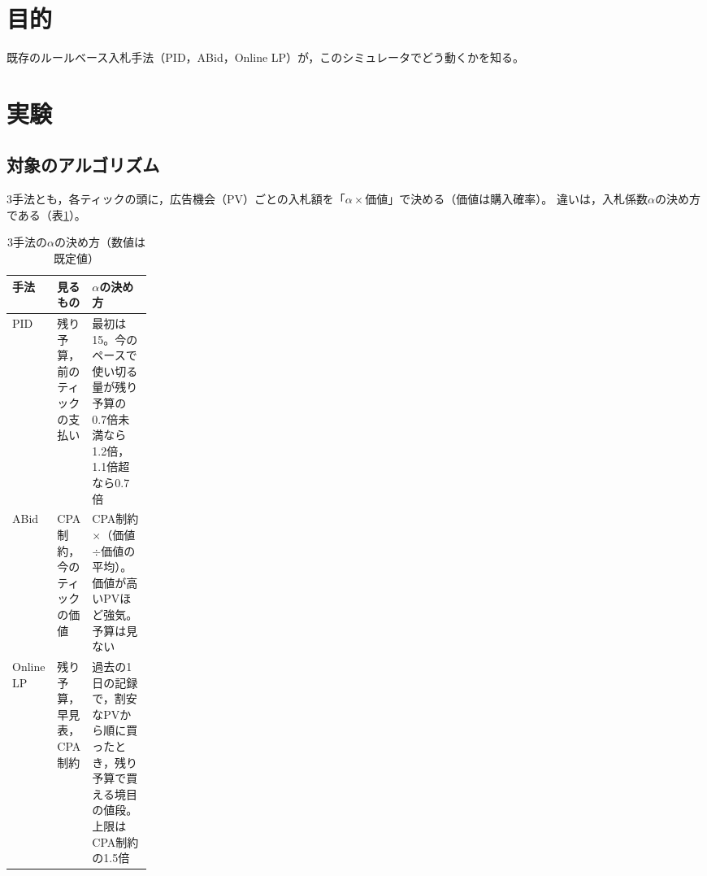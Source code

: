 \documentclass[twocolumn, 10pt]{ujarticle}
\begin{document}
\beginverification

\section{目的}\label{sec:e-purpose}

既存のルールベース入札手法（PID，ABid，Online LP）が，このシミュレータでどう動くかを知る。

\section{実験}\label{sec:e-exp}

\subsection{対象のアルゴリズム}\label{sec:e-algo}

3手法とも，各ティックの頭に，広告機会（PV）ごとの入札額を「$\alpha\times$価値」で決める（価値は購入確率）。
違いは，入札係数$\alpha$の決め方である（表\ref{tab:algo}）。

\begin{table}[H]
\centering
\caption{3手法の$\alpha$の決め方（数値は既定値）}
\label{tab:algo}
\footnotesize
\begin{tabularx}{\linewidth}{@{}l>{\raggedright\arraybackslash}p{0.2\linewidth}>{\raggedright\arraybackslash}X@{}}
\toprule
手法 & 見るもの & $\alpha$の決め方 \\
\midrule
PID & 残り予算，前のティックの支払い & 最初は15。今のペースで使い切る量が残り予算の0.7倍未満なら1.2倍，1.1倍超なら0.7倍 \\
\addlinespace
ABid & CPA制約，今のティックの価値 & CPA制約$\times$（価値$\div$価値の平均）。価値が高いPVほど強気。予算は見ない \\
\addlinespace
Online LP & 残り予算，早見表，CPA制約 & 過去の1日の記録で，割安なPVから順に買ったとき，残り予算で買える境目の値段。上限はCPA制約の1.5倍 \\
\bottomrule
\end{tabularx}
\end{table}
\end{document}
